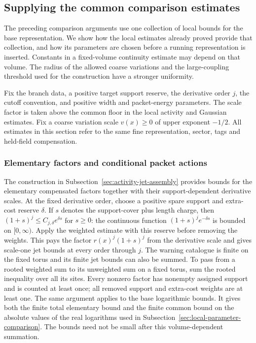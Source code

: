 \subsection{Supplying the common comparison estimates}
\label{sec:parameter-comparison-suppliers}
The preceding comparison arguments use one collection of local
bounds for the base representation. We show how the local estimates
already proved provide that collection, and how its parameters are
chosen before a running representation is inserted. Constants in a
fixed-volume continuity estimate may depend on that volume. The
radius of the allowed coarse variations and the large-coupling
threshold used for the construction have a stronger uniformity.

Fix the branch data, a positive target support reserve, the derivative
order $j$, the cutoff convention, and positive width and packet-energy
parameters. The scale factor is taken above the common floor in the
local activity and Gaussian estimates. Fix a coarse variation scale
$v(x)\ge0$ of upper exponent $-1/2$. All estimates in this section
refer to the same fine representation, sector, tags and held-field
compensation.

\subsubsection{Elementary factors and conditional packet actions}
The construction in Subsection~\ref{sec:activity-jet-assembly} provides
bounds for the elementary compensated factors together with their
support-dependent derivative scales. At the fixed derivative order,
choose a positive spare support and extra-cost reserve $\delta$.
If $s$ denotes the support-cover plus length charge, then
$(1+s)^j\le C_{j,\delta}e^{\delta s}$ for $s\ge0$: the continuous
function $(1+s)^je^{-\delta s}$ is bounded on $[0,\infty)$.
Apply the weighted estimate with this reserve before removing
the weights. This pays the factor $r(x)^j(1+s)^j$ from the derivative
scale and gives scale-one jet bounds at every order through $j$.
The warning catalogue is finite on the fixed torus and its finite
jet bounds can also be summed. To pass
from a rooted weighted sum to its unweighted sum on a fixed torus,
sum the rooted inequality over all its sites. Every nonzero factor
has nonempty assigned support and is counted at least once; all
removed support and extra-cost weights are at least one. The same
argument applies to the base logarithmic bounds. It gives both the
finite total elementary bound and the finite common bound on the
absolute values of the real logarithms used in
Subsection~\ref{sec:local-parameter-comparison}. The bounds need not be
small after this volume-dependent summation.

